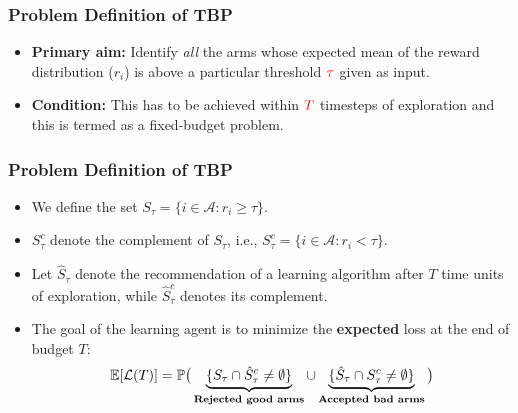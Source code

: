 \begin{frame}
\frametitle{Problem Definition of TBP}
\begin{itemize}
\item<1-> \textbf{Primary aim:} Identify \textit{all} the arms whose expected mean of the reward distribution ($r_i$) is above a particular threshold $\mathbin{\textcolor{red}{\tau}}$ given as input.
\item<2-> \textbf{Condition:} This has to be achieved within $\mathbin{\textcolor{red}{T}}$ timesteps of exploration and this is termed as a fixed-budget problem.
\end{itemize}
\end{frame}

\begin{frame}
\frametitle{Problem Definition of TBP}
\begin{itemize}
\item<1-> We define the set $S_{\tau}=\lbrace i\in \mathcal{A}: r_{i}\geq \tau \rbrace$. 
\item<2-> $S_\tau^c$ denote the complement of $S_\tau$, i.e.,  $S_{\tau}^{c}=\lbrace i\in \mathcal{A}: r_{i} < \tau \rbrace$. 
\item<3-> Let $\hat{S}_{\tau}$ denote the recommendation of a learning algorithm after $T$ time units of exploration, while $\hat{S}_{\tau}^c$ denotes its complement.
\item<4-> The goal of the learning agent is to minimize the \textbf{expected} loss at the end of budget $T$:
\begin{align*}
\mathbb{E}[\mathcal{L}(T)] &= \mathbb{P}\big(\underbrace{\lbrace S_{\tau}\cap \hat{S}_{\tau}^{c} \neq \emptyset \rbrace}_{\textbf{Rejected good arms}}  \cup   \underbrace{\lbrace \hat{S}_{\tau}\cap S_{\tau}^{c} \neq \emptyset\rbrace}_{\textbf{Accepted bad arms}}\big) \\
\end{align*}
\end{itemize}
\end{frame}

